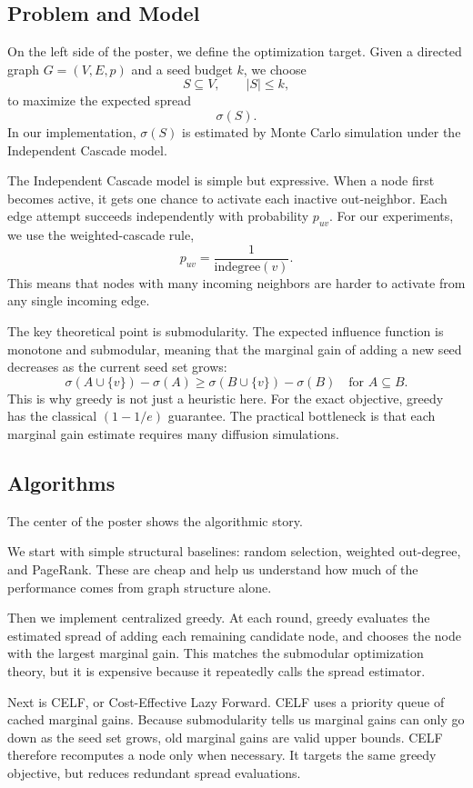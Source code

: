 \documentclass[10pt]{article}
\begin{document}
\subsection*{Problem and Model}

On the left side of the poster, we define the optimization target. Given a
directed graph \(G=(V,E,p)\) and a seed budget \(k\), we choose
\[
S\subseteq V,\qquad |S|\le k,
\]
to maximize the expected spread
\[
\sigma(S).
\]
In our implementation, \(\sigma(S)\) is estimated by Monte Carlo simulation
under the Independent Cascade model.

The Independent Cascade model is simple but expressive. When a node first
becomes active, it gets one chance to activate each inactive out-neighbor.
Each edge attempt succeeds independently with probability \(p_{uv}\). For our
experiments, we use the weighted-cascade rule,
\[
p_{uv}=\frac{1}{\mathrm{indegree}(v)}.
\]
This means that nodes with many incoming neighbors are harder to activate from
any single incoming edge.

The key theoretical point is submodularity. The expected influence function is
monotone and submodular, meaning that the marginal gain of adding a new seed
decreases as the current seed set grows:
\[
\sigma(A\cup\{v\})-\sigma(A)
\ge
\sigma(B\cup\{v\})-\sigma(B)
\quad\text{for } A\subseteq B.
\]
This is why greedy is not just a heuristic here. For the exact objective,
greedy has the classical \((1-1/e)\) guarantee. The practical bottleneck is
that each marginal gain estimate requires many diffusion simulations.

\subsection*{Algorithms}

The center of the poster shows the algorithmic story.

We start with simple structural baselines: random selection, weighted
out-degree, and PageRank. These are cheap and help us understand how much of
the performance comes from graph structure alone.

Then we implement centralized greedy. At each round, greedy evaluates the
estimated spread of adding each remaining candidate node, and chooses the node
with the largest marginal gain. This matches the submodular optimization
theory, but it is expensive because it repeatedly calls the spread estimator.

Next is CELF, or Cost-Effective Lazy Forward. CELF uses a priority queue of
cached marginal gains. Because submodularity tells us marginal gains can only
go down as the seed set grows, old marginal gains are valid upper bounds. CELF
therefore recomputes a node only when necessary. It targets the same greedy
objective, but reduces redundant spread evaluations.
\end{document}

